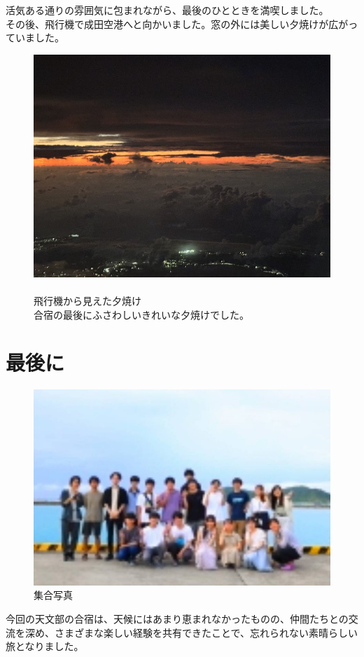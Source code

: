 \documentclass[../main]{subfiles}
\begin{document}
活気ある通りの雰囲気に包まれながら、最後のひとときを満喫しました。\\
その後、飛行機で成田空港へと向かいました。窓の外には美しい夕焼けが広がっていました。
\begin{figure}[H]
  \begin{minipage}[c]{0.49\textwidth}
  \includegraphics[width=\columnwidth]{figure/yuuyake.jpeg}
  \end{minipage}
  \hspace{0.04\columnwidth} %
  \begin{minipage}[c]{0.4\textwidth}
    \caption{\\
    飛行機から見えた夕焼け\\
    合宿の最後にふさわしいきれいな夕焼けでした。
    }
  \end{minipage}
\end{figure}
\section{最後に}
\begin{figure}[H]
  \centering
  \includegraphics[width=.8\columnwidth]{figure/syuugousyasinn.JPG}
  \caption{集合写真}
\end{figure}
今回の天文部の合宿は、天候にはあまり恵まれなかったものの、仲間たちとの交流を深め、さまざまな楽しい経験を共有できたことで、忘れられない素晴らしい旅となりました。
\end{document}
